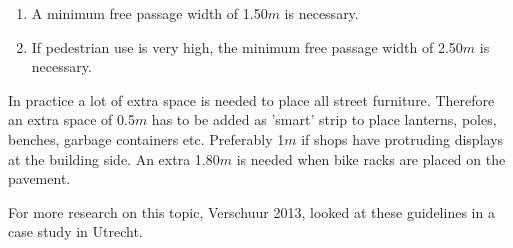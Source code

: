 
\begin{enumerate}
\item A minimum free passage width of 1.50$m$ is necessary. 
\item If pedestrian use is very high, the minimum free passage width of 2.50$m$ is necessary.
\end{enumerate}

In practice a lot of extra space is needed to place all street furniture. Therefore an extra space of 0.5$m$ has to be added as 'smart' strip to place lanterns, poles, benches, garbage containers etc. Preferably 1$m$ if shops have protruding displays at the building side. An extra 1.80$m$ is needed when bike racks are placed on the pavement.~\cite{leidraad2011}

For more research on this topic, Verschuur 2013, looked at these guidelines in a case study in Utrecht.~\cite{Verschuur2013}





